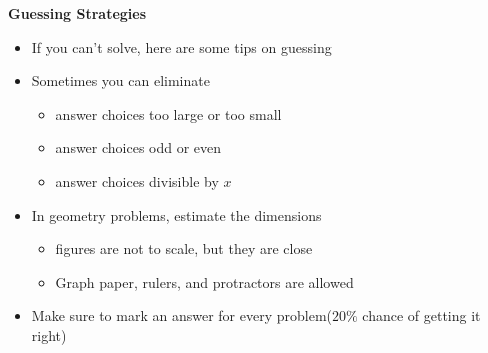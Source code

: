 \documentclass[11pt,letterpaper]{article}
\begin{document}
\begin{minipage}{\textwidth}
     \noindent \textbf{Guessing Strategies}
     \begin{itemize}
          \item If you can’t solve, here are some tips on guessing
          \item Sometimes you can eliminate
          \begin{itemize}
               \item answer choices too large or too small
               \item answer choices odd or even
               \item answer choices divisible by $x$
          \end{itemize}
          \item In geometry problems, estimate the dimensions
          \begin{itemize}
               \item figures are not to scale, but they are close
               \item Graph paper, rulers, and protractors are allowed
          \end{itemize}
          \item Make sure to mark an answer for every problem($20\%$ chance of getting it right)
        \end{itemize}
\end{minipage}
\end{document}

